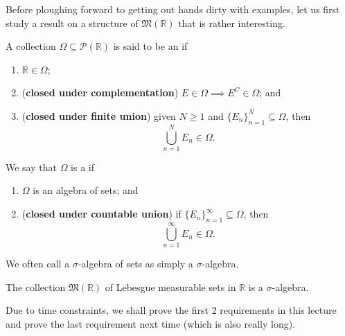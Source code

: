 \documentclass[notoc,notitlepage]{tufte-book}
\begin{document}
Before ploughing forward to getting out hands dirty with examples, let us first
study a result on a structure of $\mathfrak{M}(\mathbb{R})$ that is rather
interesting. 

\begin{defn}\label{defn:algebra_of_sets}\label{defn:sigma_algebra_of_sets}
  A collection $\Omega \subseteq \mathcal{P}(\mathbb{R})$ is said to be an
   if
  \begin{enumerate}
    \item $\mathbb{R} \in \Omega$;
    \item (\textbf{closed under complementation}) $E \in \Omega \implies E^C \in
      \Omega$; and
    \item (\textbf{closed under finite union}) given $N \geq 1$ and $\{ E_n
      \}_{n=1}^{N} \subseteq \Omega$, then
      \begin{equation*}
        \bigcup_{n=1}^{N} E_n \in \Omega.
      \end{equation*}
  \end{enumerate}
  We say that $\Omega$ is a  if
  \begin{enumerate}
    \item $\Omega$ is an algebra of sets; and
    \item (\textbf{closed under countable union}) if $\{ E_n \}_{n=1}^{\infty}
      \subseteq \Omega$, then
      \begin{equation*}
        \bigcup_{n=1}^{\infty} E_n \in \Omega.
      \end{equation*}
  \end{enumerate}
\end{defn}

\begin{note}
  We often call a $\sigma$-algebra of sets as simply a $\sigma$-algebra.
\end{note}

\begin{thm}\label{thm:_m_r_is_a_sigma_algebra} 
  The collection $\mathfrak{M}(\mathbb{R})$ of Lebesgue measurable sets in
  $\mathbb{R}$ is a $\sigma$-algebra.
\end{thm}

Due to time constraints, we shall prove the first 2 requirements in this lecture
and prove the last requirement next time (which is also really long).
\end{document}
